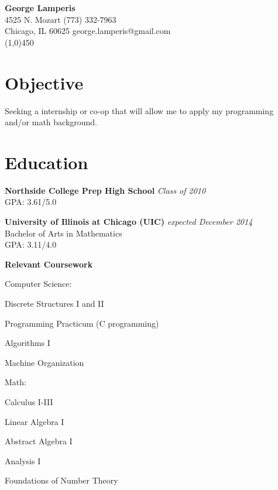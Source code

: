 \documentclass[letterpaper, 11pt, oneside]{memoir}
\begin{document}
\begin{center}
    \textbf{\LARGE{George Lamperis}} \\
    4525 N. Mozart      \hfill  (773) 332-7963  \\
    Chicago, IL 60625   \hfill  george.lamperis@gmail.com \\
    \line(1,0){450}
\end{center}

\vspace{-3ex}
\section*{Objective}
Seeking a internship or co-op that will allow me to apply my programming and/or
math background.

\section*{Education}
\textbf{Northside College Prep High School} \hfill \emph{Class of 2010} \\
GPA: 3.61/5.0

\textbf{University of Illinois at Chicago (UIC)} \hfill \emph{expected December 2014} \\
Bachelor of Arts in Mathematics \\
GPA: 3.11/4.0

\textbf{Relevant Coursework}

Computer Science:
\begin{compactitem}
    \item Discrete Structures I and II
    \item Programming Practicum (C programming)
    \item Algorithms I
    \item Machine Organization
\end{compactitem}

Math:
\begin{compactitem}
    \item Calculus I-III 
    \item Linear Algebra I
    \item Abstract Algebra I
    \item Analysis I
    \item Foundations of Number Theory
\end{compactitem}
\end{document}
